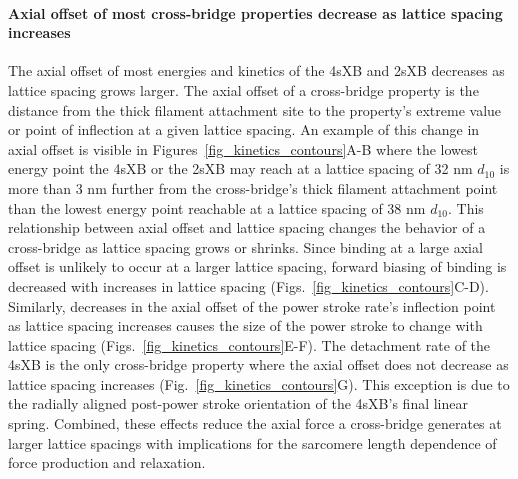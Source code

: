 \documentclass[]{article}
\begin{document}
\paragraph{Axial offset of most cross-bridge properties decrease as lattice spacing increases} %
The axial offset of most energies and kinetics of the 4sXB and 2sXB decreases as lattice spacing grows larger.
The axial offset of a cross-bridge property is the distance from the thick filament attachment site to the property's extreme value or point of inflection at a given lattice spacing. 
An example of this change in axial offset is visible in Figures~\ref{fig_kinetics_contours}A-B where the lowest energy point the 4sXB or the 2sXB may reach at a lattice spacing of 32 nm $d_{10}$ is more than 3 nm further from the cross-bridge's thick filament attachment point than the lowest energy point reachable at a lattice spacing of 38 nm $d_{10}$.
This relationship between axial offset and lattice spacing changes the behavior of a cross-bridge as lattice spacing grows or shrinks.
Since binding at a large axial offset is unlikely to occur at a larger lattice spacing, forward biasing of binding is decreased with increases in lattice spacing (Figs.~\ref{fig_kinetics_contours}C-D). 
Similarly, decreases in the axial offset of the power stroke rate's inflection point as lattice spacing increases causes the size of the power stroke to change with lattice spacing (Figs.~\ref{fig_kinetics_contours}E-F).
The detachment rate of the 4sXB is the only cross-bridge property where the axial offset does not decrease as lattice spacing increases (Fig.~\ref{fig_kinetics_contours}G).
This exception is due to the radially aligned post-power stroke orientation of the 4sXB's final linear spring. 
Combined, these effects reduce the axial force a cross-bridge generates at larger lattice spacings with implications for the sarcomere length dependence of force production and relaxation. 
\end{document}
